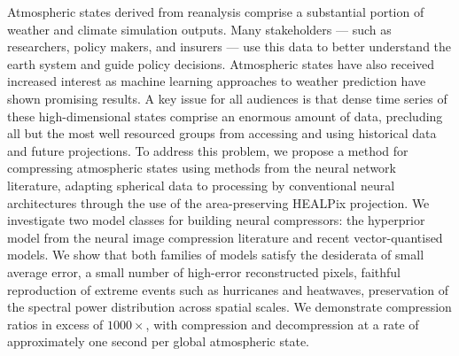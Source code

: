 Atmospheric states derived from reanalysis comprise a substantial portion of weather and climate simulation outputs. Many stakeholders --- such as researchers, policy makers, and insurers --- use this data to better understand the earth system and guide policy decisions. Atmospheric states have also received increased interest as machine learning approaches to weather prediction have shown promising results. A key issue for all audiences is that dense time series of these high-dimensional states comprise an enormous amount of data, precluding all but the most well resourced groups from accessing and using historical data and future projections. To address this problem, we propose a method for compressing atmospheric states using methods from the neural network literature, adapting spherical data to processing by conventional neural architectures through the use of the area-preserving HEALPix projection.
We investigate two model classes for building neural compressors: the hyperprior model from the neural image compression literature and recent vector-quantised models.
We show that both families of models satisfy the desiderata of small average error, a small number of high-error reconstructed pixels, faithful reproduction of extreme events such as hurricanes and heatwaves, preservation of the spectral power distribution across spatial scales.
We demonstrate compression ratios in excess of $1000\times$, with compression and decompression at a rate of approximately one second per global atmospheric state.








